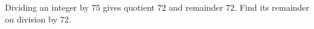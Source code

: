Dividing an integer by 75 gives quotient 72 and remainder 72. Find its remainder on division by 72.
